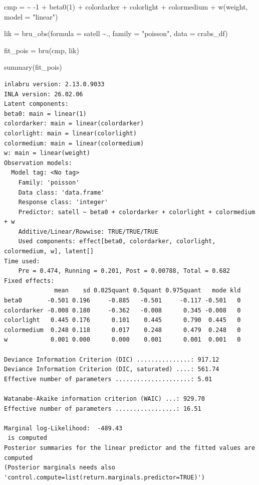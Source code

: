 \documentclass[
  letterpaper,
  DIV=11,
  numbers=noendperiod]{scrartcl}
\newenvironment{Shaded}{\begin{snugshade}}{\end{snugshade}}
\newcommand{\AttributeTok}[1]{\textcolor[rgb]{0.40,0.45,0.13}{#1}}
\newcommand{\DecValTok}[1]{\textcolor[rgb]{0.68,0.00,0.00}{#1}}
\newcommand{\ErrorTok}[1]{\textcolor[rgb]{0.68,0.00,0.00}{#1}}
\newcommand{\FunctionTok}[1]{\textcolor[rgb]{0.28,0.35,0.67}{#1}}
\newcommand{\NormalTok}[1]{\textcolor[rgb]{0.00,0.23,0.31}{#1}}
\newcommand{\OtherTok}[1]{\textcolor[rgb]{0.00,0.23,0.31}{#1}}
\newcommand{\SpecialCharTok}[1]{\textcolor[rgb]{0.37,0.37,0.37}{#1}}
\newcommand{\StringTok}[1]{\textcolor[rgb]{0.13,0.47,0.30}{#1}}
\begin{document}
\begin{Shaded}
\begin{Highlighting}[]
\NormalTok{cmp }\OtherTok{=}  \ErrorTok{\textasciitilde{}} \SpecialCharTok{{-}}\DecValTok{1} \SpecialCharTok{+} \FunctionTok{beta0}\NormalTok{(}\DecValTok{1}\NormalTok{) }\SpecialCharTok{+}\NormalTok{  colordarker }\SpecialCharTok{+}
\NormalTok{       colorlight }\SpecialCharTok{+}\NormalTok{ colormedium }\SpecialCharTok{+}
       \FunctionTok{w}\NormalTok{(weight, }\AttributeTok{model =} \StringTok{"linear"}\NormalTok{)}

\NormalTok{lik }\OtherTok{=}  \FunctionTok{bru\_obs}\NormalTok{(}\AttributeTok{formula =}\NormalTok{ satell }\SpecialCharTok{\textasciitilde{}}\NormalTok{.,}
            \AttributeTok{family =} \StringTok{"poisson"}\NormalTok{,}
            \AttributeTok{data =}\NormalTok{ crabs\_df)}

\NormalTok{fit\_pois }\OtherTok{=} \FunctionTok{bru}\NormalTok{(cmp, lik)}

\FunctionTok{summary}\NormalTok{(fit\_pois)}
\end{Highlighting}
\end{Shaded}

\begin{verbatim}
inlabru version: 2.13.0.9033 
INLA version: 26.02.06 
Latent components:
beta0: main = linear(1)
colordarker: main = linear(colordarker)
colorlight: main = linear(colorlight)
colormedium: main = linear(colormedium)
w: main = linear(weight)
Observation models:
  Model tag: <No tag>
    Family: 'poisson'
    Data class: 'data.frame'
    Response class: 'integer'
    Predictor: satell ~ beta0 + colordarker + colorlight + colormedium + w
    Additive/Linear/Rowwise: TRUE/TRUE/TRUE
    Used components: effect[beta0, colordarker, colorlight, colormedium, w], latent[] 
Time used:
    Pre = 0.474, Running = 0.201, Post = 0.00788, Total = 0.682 
Fixed effects:
              mean    sd 0.025quant 0.5quant 0.975quant   mode kld
beta0       -0.501 0.196     -0.885   -0.501     -0.117 -0.501   0
colordarker -0.008 0.180     -0.362   -0.008      0.345 -0.008   0
colorlight   0.445 0.176      0.101    0.445      0.790  0.445   0
colormedium  0.248 0.118      0.017    0.248      0.479  0.248   0
w            0.001 0.000      0.000    0.001      0.001  0.001   0

Deviance Information Criterion (DIC) ...............: 917.12
Deviance Information Criterion (DIC, saturated) ....: 561.74
Effective number of parameters .....................: 5.01

Watanabe-Akaike information criterion (WAIC) ...: 929.70
Effective number of parameters .................: 16.51

Marginal log-Likelihood:  -489.43 
 is computed 
Posterior summaries for the linear predictor and the fitted values are computed
(Posterior marginals needs also 'control.compute=list(return.marginals.predictor=TRUE)')
\end{verbatim}
\end{document}
